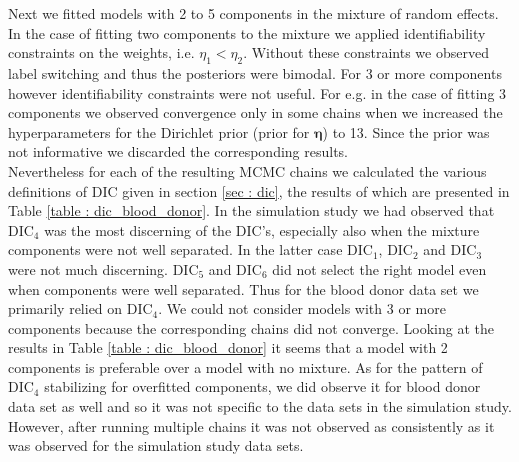 Next we fitted models with 2 to 5 components in the mixture of random effects. In the case of fitting two components to the mixture we applied identifiability constraints on the weights, i.e. $\eta_1 < \eta_2$. Without these constraints we observed label switching and thus the posteriors were bimodal. For 3 or more components however identifiability constraints were not useful. For e.g. in the case of fitting 3 components we observed convergence only in some chains when we increased the hyperparameters for the Dirichlet prior (prior for $\boldsymbol{\eta}$) to 13. Since the prior was not informative we discarded the corresponding results.\\

Nevertheless for each of the resulting MCMC chains we calculated the various definitions of DIC given in section \ref{sec : dic}, the results of which are presented in Table \ref{table : dic_blood_donor}. In the simulation study we had observed that $\text{DIC}_4$ was the most discerning of the DIC's, especially also when the mixture components were not well separated. In the latter case $\text{DIC}_1$, $\text{DIC}_2$ and $\text{DIC}_3$ were not much discerning. $\text{DIC}_5$ and $\text{DIC}_6$ did not select the right model even when components were well separated. Thus for the blood donor data set we primarily relied on $\text{DIC}_4$. We could not consider models with 3 or more components because the corresponding chains did not converge. Looking at the results in Table \ref{table : dic_blood_donor} it seems that a model with 2 components is preferable over a model with no mixture. As for the pattern of $\text{DIC}_4$ stabilizing for overfitted components, we did observe it for blood donor data set as well and so it was not specific to the data sets in the simulation study. However, after running multiple chains it was not observed as consistently as it was observed for the simulation study data sets.

